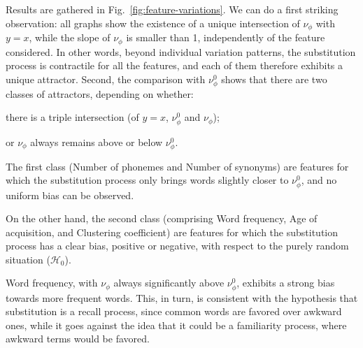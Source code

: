 \medskip
Results are gathered in Fig.~\ref{fig:feature-variations}.
We can do a first striking observation: all graphs show the existence of a unique intersection of $\nu_{\phi}$ with $y=x$, while the slope of $\nu_{\phi}$ is smaller than 1, independently of the feature considered.
In other words, beyond individual variation patterns, the substitution process is contractile for all the features, and each of them therefore exhibits a unique attractor.
Second, the comparison with $\nu_{\phi}^0$ shows that there are two classes of attractors, depending on whether:
\begin{APAenumerate}
\item there is a triple intersection (of $y=x$, $\nu_{\phi}^0$ and $\nu_{\phi}$);
\item or $\nu_{\phi}$ always remains above or below $\nu_{\phi}^0$.
\end{APAenumerate}
The first class (Number of phonemes and Number of synonyms) are features for which the substitution process only brings words slightly closer to $\nu_{\phi}^0$, and no uniform bias can be observed.


On the other hand, the second class (comprising Word frequency, Age of acquisition, and Clustering coefficient) are features for which the substitution process has a clear bias, positive or negative, with respect to the purely random situation ($\mathcal{H}_0$).

Word frequency, with $\nu_{\phi}$ always significantly above $\nu_{\phi}^0$, exhibits a strong bias towards more frequent words. This, in turn, is consistent with the hypothesis that substitution is a recall process, since common words are favored over awkward ones, while it goes against the idea that it could be a familiarity process, where awkward terms would be favored.


